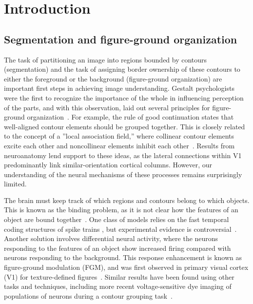 \chapter{Introduction}
\label{sec:intro}


\section{Segmentation and figure-ground organization}

The task of partitioning an image into regions bounded by contours (segmentation) and the task of assigning border ownership of these contours to either the foreground or the background (figure-ground organization) are important first steps in achieving image understanding. Gestalt psychologists were the first to recognize the importance of the whole in influencing perception of the parts, and with this observation, laid out several principles for figure-ground organization~\citep{Koffka35, Wertheimer23}. For example, the rule of good continuation states that well-aligned contour elements should be grouped together. This is closely related to the concept of a ''local association field,'' where collinear contour elements excite each other and noncollinear elements inhibit each other~\citep{Ullman92, Field_etal93}. Results from neuroanatomy lend support to these ideas, as the lateral connections within V1 predominantly link similar-orientation cortical columns. However, our understanding of the neural mechanisms of these processes remains surprisingly limited.
 
The brain must keep track of which regions and contours belong to which objects. This is known as the binding problem, as it is not clear how the features of an object are bound together~\citep{Treisman96b}. One class of models relies on the fast temporal coding structures of spike trains \citep{Singer99b}, but experimental evidence is controversial~\citep{Thiele_Stoner03,Roelfsema_etal04,Dong_etal08a}. Another solution involves differential neural activity, where the neurons responding to the features of an object show increased firing compared with neurons responding to the background. This response enhancement is known as figure-ground modulation (FGM), and was first observed in primary visual cortex (V1) for texture-defined figures~\citep{Lamme95}. Similar results have been found using other tasks and techniques, including more recent voltage-sensitive dye imaging of populations of neurons during a contour grouping task~\citep{Gilad_etal13}.

